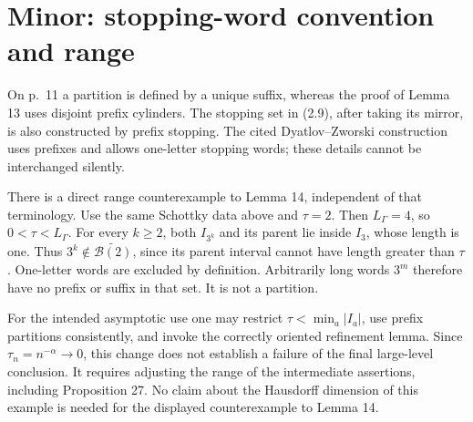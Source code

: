 \documentclass[10pt]{article}
\begin{document}
\section*{Minor: stopping-word convention and range}
On p. 11 a partition is defined by a unique suffix, whereas the proof of Lemma 13 uses disjoint prefix cylinders. The stopping set in (2.9), after taking its mirror, is also constructed by prefix stopping. The cited Dyatlov–Zworski construction uses prefixes and allows one-letter stopping words; these details cannot be interchanged silently.\par
There is a direct range counterexample to Lemma 14, independent of that terminology. Use the same Schottky data above and \(\tau=2\). Then \(L_\Gamma=4\), so \(0<\tau<L_\Gamma\). For every \(k\ge2\), both \(I_{3^k}\) and its parent lie inside \(I_3\), whose length is one. Thus \(3^k\notin\widetilde{\mathcal B(2)}\), since its parent interval cannot have length greater than \(\tau\). One-letter words are excluded by definition. Arbitrarily long words \(3^m\) therefore have no prefix or suffix in that set. It is not a partition.\par
For the intended asymptotic use one may restrict \(\tau<\min_a|I_a|\), use prefix partitions consistently, and invoke the correctly oriented refinement lemma. Since \(\tau_n=n^{-\alpha}\to0\), this change does not establish a failure of the final large-level conclusion. It requires adjusting the range of the intermediate assertions, including Proposition 27. No claim about the Hausdorff dimension of this example is needed for the displayed counterexample to Lemma 14.\par
\end{document}
